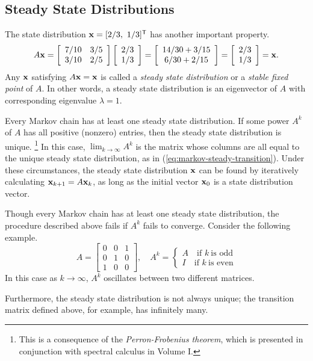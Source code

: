 \subsection*{Steady State Distributions} %

The state distribution $\x = [2/3,\ 1/3]\trp$ has another important property.
\[
A\mathbf{x} =
\left[\begin{array}{cc}
7/10 & 3/5 \\
3/10 & 2/5 \\
\end{array}\right]
\left[\begin{array}{c}2/3 \\ 1/3\end{array}\right]
=
\left[\begin{array}{c}14/30 + 3/15 \\ 6/30 + 2/15\end{array}\right]
=
\left[\begin{array}{c}2/3 \\ 1/3\end{array}\right]
= \mathbf{x}.
\]
Any $\mathbf{x}$ satisfying $A\mathbf{x} = \mathbf{x}$ is called a \emph{steady state distribution} or a \emph{stable fixed point} of $A$.
In other words, a steady state distribution is an eigenvector of $A$ with corresponding eigenvalue $\lambda = 1$.

Every Markov chain has at least one steady state distribution.
If some power $A^k$ of $A$ has all positive (nonzero) entries, then the steady state distribution is unique.%
\footnote{This is a consequence of the \emph{Perron-Frobenius theorem}, which is presented in conjunction with spectral calculus in Volume I.}
In this case, $\lim_{k\rightarrow\infty}A^k$ is the matrix whose columns are all equal to the unique steady state distribution, as in (\ref{eq:markov-steady-transition}).
Under these circumstances, the steady state distribution $\mathbf{x}$ can be found by iteratively calculating $\mathbf{x}_{k+1} = A\mathbf{x}_k$, as long as the initial vector $\mathbf{x}_{0}$ is a state distribution vector.

\begin{warn}
Though every Markov chain has at least one steady state distribution, the procedure described above fails if $A^k$ fails to converge.
Consider the following example.
\[
A = \left[\begin{array}{ccc}
0 & 0 & 1 \\
0 & 1 & 0 \\
1 & 0 & 0
\end{array}\right]
,\quad A^k = \begin{cases}
A\quad\text{if } k\ \text{is odd}
\\
I\quad\text{if } k\ \text{is even}
\end{cases}
\]
In this case as $k\rightarrow\infty$, $A^k$ oscillates between two different matrices.

Furthermore, the steady state distribution is not always unique; the transition matrix defined above, for example, has infinitely many.
\end{warn}

